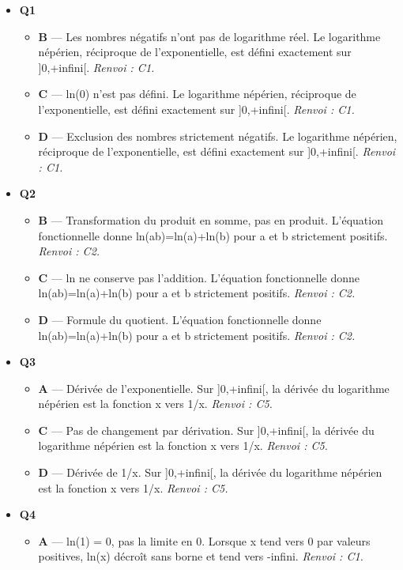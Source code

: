 \begin{itemize}
  \item \textbf{Q1}
  \begin{itemize}
    \item \textbf{B} — Les nombres négatifs n'ont pas de logarithme réel. Le logarithme népérien, réciproque de l'exponentielle, est défini exactement sur ]0,+infini[. \emph{Renvoi : C1.}
    \item \textbf{C} — ln(0) n'est pas défini. Le logarithme népérien, réciproque de l'exponentielle, est défini exactement sur ]0,+infini[. \emph{Renvoi : C1.}
    \item \textbf{D} — Exclusion des nombres strictement négatifs. Le logarithme népérien, réciproque de l'exponentielle, est défini exactement sur ]0,+infini[. \emph{Renvoi : C1.}
  \end{itemize}
  \item \textbf{Q2}
  \begin{itemize}
    \item \textbf{B} — Transformation du produit en somme, pas en produit. L'équation fonctionnelle donne ln(ab)=ln(a)+ln(b) pour a et b strictement positifs. \emph{Renvoi : C2.}
    \item \textbf{C} — ln ne conserve pas l'addition. L'équation fonctionnelle donne ln(ab)=ln(a)+ln(b) pour a et b strictement positifs. \emph{Renvoi : C2.}
    \item \textbf{D} — Formule du quotient. L'équation fonctionnelle donne ln(ab)=ln(a)+ln(b) pour a et b strictement positifs. \emph{Renvoi : C2.}
  \end{itemize}
  \item \textbf{Q3}
  \begin{itemize}
    \item \textbf{A} — Dérivée de l'exponentielle. Sur ]0,+infini[, la dérivée du logarithme népérien est la fonction x vers 1/x. \emph{Renvoi : C5.}
    \item \textbf{C} — Pas de changement par dérivation. Sur ]0,+infini[, la dérivée du logarithme népérien est la fonction x vers 1/x. \emph{Renvoi : C5.}
    \item \textbf{D} — Dérivée de 1/x. Sur ]0,+infini[, la dérivée du logarithme népérien est la fonction x vers 1/x. \emph{Renvoi : C5.}
  \end{itemize}
  \item \textbf{Q4}
  \begin{itemize}
    \item \textbf{A} — ln(1) = 0, pas la limite en 0. Lorsque x tend vers 0 par valeurs positives, ln(x) décroît sans borne et tend vers -infini. \emph{Renvoi : C1.}

\end{itemize}
\end{itemize}
